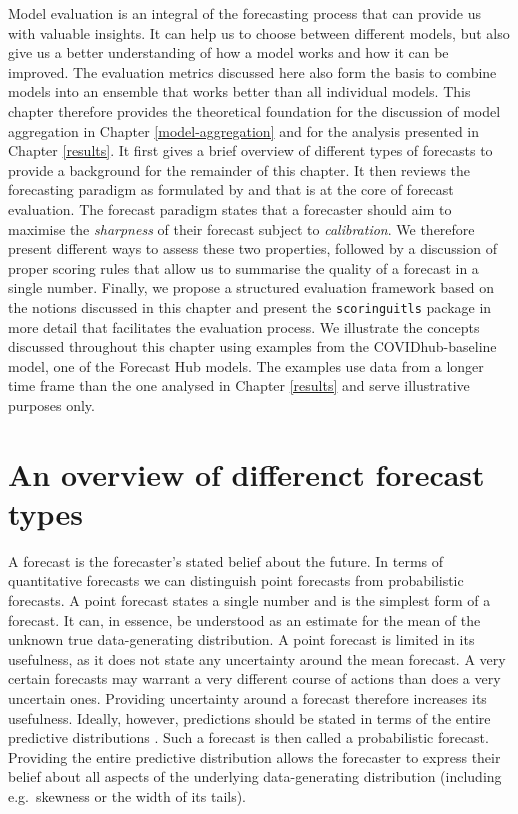 \documentclass[
]{book}
\begin{document}
Model evaluation is an integral of the forecasting process that can provide us with valuable insights. It can help us to choose between different models, but also give us a better understanding of how a model works and how it can be improved. The evaluation metrics discussed here also form the basis to combine models into an ensemble that works better than all individual models. This chapter therefore provides the theoretical foundation for the discussion of model aggregation in Chapter \ref{model-aggregation} and for the analysis presented in Chapter \ref{results}. It first gives a brief overview of different types of forecasts to provide a background for the remainder of this chapter. It then reviews the forecasting paradigm as formulated by \citet{gneitingCalibratedProbabilisticForecasting2005} and \citet{gneitingProbabilisticForecastsCalibration2007} that is at the core of forecast evaluation. The forecast paradigm states that a forecaster should aim to maximise the \emph{sharpness} of their forecast subject to \emph{calibration}. We therefore present different ways to assess these two properties, followed by a discussion of proper scoring rules that allow us to summarise the quality of a forecast in a single number. Finally, we propose a structured evaluation framework based on the notions discussed in this chapter and present the \texttt{scoringuitls} package in more detail that facilitates the evaluation process. We illustrate the concepts discussed throughout this chapter using examples from the COVIDhub-baseline model, one of the Forecast Hub models. The examples use data from a longer time frame than the one analysed in Chapter \ref{results} and serve illustrative purposes only.

\hypertarget{forecast-types}{%
\section{An overview of differenct forecast types}\label{forecast-types}}

A forecast is the forecaster's stated belief about the future. In terms of quantitative forecasts we can distinguish point forecasts from probabilistic forecasts. A point forecast states a single number and is the simplest form of a forecast. It can, in essence, be understood as an estimate for the mean of the unknown true data-generating distribution. A point forecast is limited in its usefulness, as it does not state any uncertainty around the mean forecast. A very certain forecasts may warrant a very different course of actions than does a very uncertain ones. Providing uncertainty around a forecast therefore increases its usefulness. Ideally, however, predictions should be stated in terms of the entire predictive distributions \citep{gneitingStrictlyProperScoring2007}. Such a forecast is then called a probabilistic forecast. Providing the entire predictive distribution allows the forecaster to express their belief about all aspects of the underlying data-generating distribution (including e.g.~skewness or the width of its tails).
\end{document}
